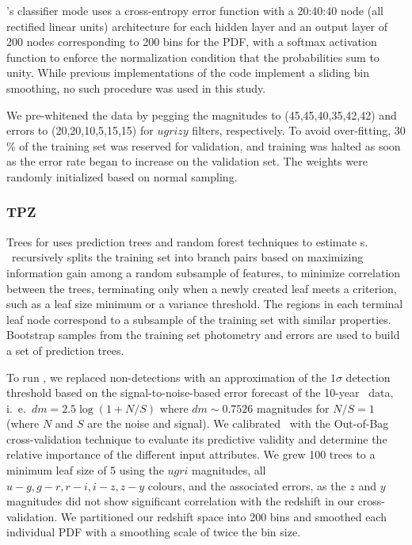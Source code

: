 \skynet's classifier mode uses a cross-entropy error function with a 20:40:40 node (all rectified linear units) architecture for each hidden layer and an output layer of 200 nodes corresponding to 200 bins for the PDF, with a softmax activation function to enforce the normalization condition that the probabilities sum to unity.
While previous implementations of the code \citep[see Appendix C.3 of~][]{sanchez_photometric_2014,bonnett_using_2015} implement a sliding bin smoothing, no such procedure was used in this study.

We pre-whitened the data by pegging the magnitudes to (45,45,40,35,42,42) and errors to (20,20,10,5,15,15) for $ugrizy$ filters, respectively.
To avoid over-fitting, $30$\% of the training set was reserved for validation, and training was halted as soon as the error rate began to increase on the validation set.
The weights were randomly initialized based on normal sampling.

\subsubsection{TPZ}

Trees for \Pz \citep[\tpz\footnote{\url{https://github.com/mgckind/MLZ}},][]{carrasco_kind_tpz:_2013,carrasco_kind_exhausting_2014} uses prediction trees and random forest techniques to estimate \pzpdf s.
\tpz\ recursively splits the training set into branch pairs based on maximizing information gain among a random subsample of features, to minimize correlation between the trees, terminating only when a newly created leaf meets a criterion, such as a leaf size minimum or a variance threshold.
The regions in each terminal leaf node correspond to a subsample of the training set with similar properties.
Bootstrap samples from the training set photometry and errors are used to build a set of prediction trees.

To run \tpz, we replaced non-detections with an approximation of the $1\sigma$ detection threshold based on the signal-to-noise-based error forecast of the 10-year \lsst\ data, i.~e.~$dm = 2.5 \log (1 + N/S)$ where $dm \sim 0.7526$ magnitudes for $N/S = 1$ (where $N$ and $S$ are the noise and signal).
We calibrated \tpz\ with the Out-of-Bag cross-validation technique \citep{breiman_classification_1984,carrasco_kind_tpz:_2013} to evaluate its predictive validity and determine the relative importance of the different input attributes.
We grew 100 trees to a minimum leaf size of 5 using the $ugri$ magnitudes, all $u-g, g-r, r-i, i-z, z-y$ colours, and the associated errors, as the $z$ and $y$ magnitudes did not show significant correlation with the redshift in our cross-validation.
We partitioned our redshift space into 200 bins and smoothed each individual PDF with a smoothing scale of twice the bin size.


